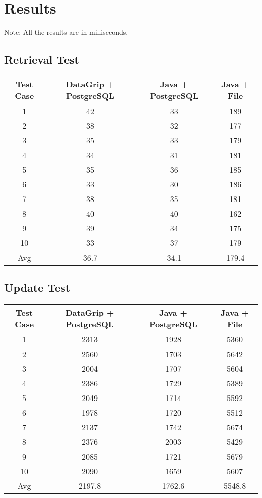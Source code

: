 \documentclass[a4paper,12pt]{article}
\begin{document}
\section{Results}
\noindent
Note: All the results are in milliseconds.

\subsection{Retrieval Test}
\begin{center}
	\begin{tabular}{cccc}
		\toprule
		Test Case & DataGrip + PostgreSQL & Java + PostgreSQL & Java + File \\ 
		\midrule
        1 & 42 & 33 & 189 \\ 
        2 & 38 & 32 & 177 \\ 
        3 & 35 & 33 & 179 \\ 
        4 & 34 & 31 & 181 \\ 
        5 & 35 & 36 & 185 \\ 
        6 & 33 & 30 & 186 \\ 
        7 & 38 & 35 & 181 \\ 
        8 & 40 & 40 & 162 \\ 
        9 & 39 & 34 & 175 \\ 
        10 & 33 & 37 & 179 \\ 
        Avg & 36.7 & 34.1 & 179.4 \\ 
		\bottomrule
	\end{tabular}
\end{center}

\subsection{Update Test}
\begin{center}
	\begin{tabular}{cccc}
		\toprule
		Test Case & DataGrip + PostgreSQL & Java + PostgreSQL & Java + File \\ 
		\midrule
        1 & 2313 & 1928 & 5360 \\ 
        2 & 2560 & 1703 & 5642 \\ 
        3 & 2004 & 1707 & 5604 \\ 
        4 & 2386 & 1729 & 5389 \\ 
        5 & 2049 & 1714 & 5592 \\ 
        6 & 1978 & 1720 & 5512 \\ 
        7 & 2137 & 1742 & 5674 \\ 
        8 & 2376 & 2003 & 5429 \\ 
        9 & 2085 & 1721 & 5679 \\ 
        10 & 2090 & 1659 & 5607 \\ 
        Avg & 2197.8 & 1762.6 & 5548.8 \\ 
		\bottomrule
	\end{tabular}
\end{center}
\end{document}
